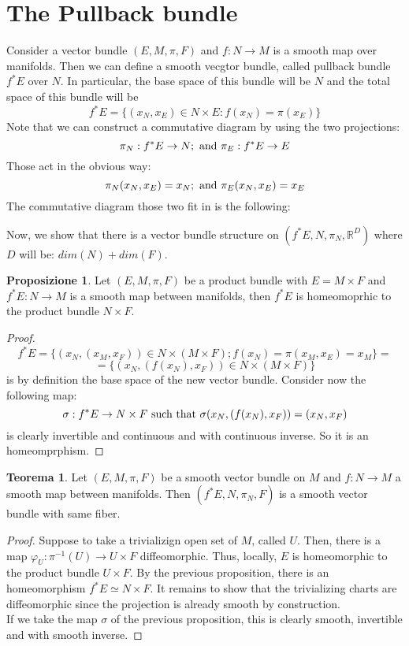 \documentclass[12pt,a4paper]{report}
\theoremstyle{definition}
\theoremstyle{Theorem}
\newtheorem{Theo}[Def]{Teorema}
\newtheorem{Prop}[Def]{Proposizione}
\theoremstyle{definition}
\theoremstyle{definition}
\theoremstyle{definition}
\begin{document}
		\section{The Pullback bundle}
			Consider a vector bundle $(E,M,\pi,F)$ and $f:N\rightarrow M$ is a smooth map over manifolds. Then we can define a smooth vecgtor bundle, called pullback bundle $f^*E$ over $N$. In particular, the base space of this bundle will be $N$ and the total space of this bundle will be 
			$$f^*E=\{(x_N,x_E)\in N\times E:f(x_N)=\pi(x_E)\}$$
			Note that we can construct a commutative diagram by using the two projections:
			$$\pi_N:f^*E\rightarrow N; \hbox{ and } \pi_E:f^*E\rightarrow E$$
			Those act in the obvious way:
			$$\pi_N(x_N,x_E)=x_N; \hbox{ and } \pi_E(x_N,x_E)=x_E$$
			The commutative diagram those two fit in is the following:\\
			\begin{center}
			\end{center}
			Now, we show that there is a vector bundle structure on $(f^*E,N,\pi_N,\mathbb{R}^D)$ where $D$ will be: $dim(N)+dim(F)$.
			\begin{Prop}
				Let $(E,M,\pi,F)$ be a product bundle with $E=M\times F$ and $f^*E:N\rightarrow M$ is a smooth map between manifolds, then $f^*E$ is homeomoprhic to the product bundle $N\times F$.
			\end{Prop}
			\begin{proof}
				$$f^*E=\{(x_N,(x_M,x_F))\in N\times (M\times F);f(x_N)=\pi(x_M,x_E)=x_M\}=$$
				$$=\{(x_N,(f(x_N),x_F))\in N\times (M\times F)\}$$ 
				is by definition the base space of the new vector bundle. Consider now the following map:
				$$\sigma:f^*E\rightarrow N\times F \hbox{ such that }
				\sigma(x_N,(f(x_N),x_F))=(x_N,x_F)$$
				is clearly invertible and continuous and with continuous inverse. So it is an homeomprphism.
			\end{proof}
			\begin{Theo}
				Let $(E,M,\pi,F)$ be a smooth vector bundle on $M$ and $f:N\rightarrow M$ a smooth map between manifolds. Then $(f^*E,N,\pi_N,F)$ is a smooth vector bundle with same fiber.
			\end{Theo}
			\begin{proof}
				Suppose to take a trivializign open set of $M$, called $U$. Then, there is a map $\varphi_U:\pi^{-1}(U)\rightarrow U\times F$ diffeomorphic. Thus, locally, $E$ is homeomorphic to the product bundle $U\times F$. By the previous proposition, there is an homeomorphism $f^*E\simeq N\times F$. It remains to show that the trivializing charts are diffeomorphic since the projection is already smooth by construction.\\
				If we take the map $\sigma$ of the previous proposition, this is clearly smooth, invertible and with smooth inverse.
			\end{proof}
\end{document}
